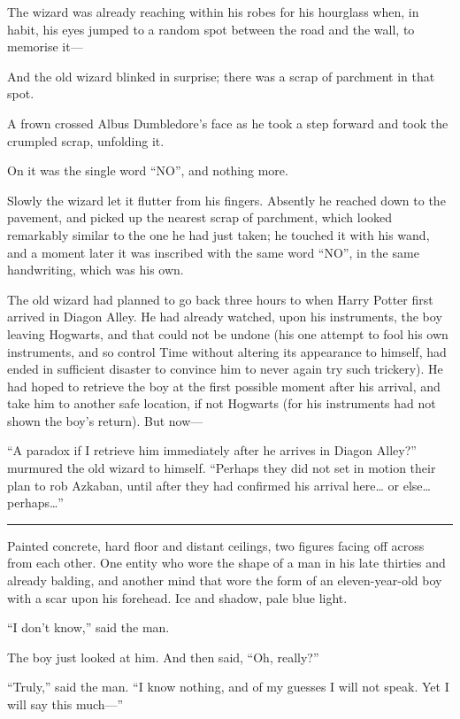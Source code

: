 The wizard was already reaching within his robes for his hourglass when,
in habit, his eyes jumped to a random spot between the road and the
wall, to memorise it---

And the old wizard blinked in surprise; there was a scrap of parchment
in that spot.

A frown crossed Albus Dumbledore's face as he took a step forward and
took the crumpled scrap, unfolding it.

On it was the single word ``NO'', and nothing more.

Slowly the wizard let it flutter from his fingers. Absently he reached
down to the pavement, and picked up the nearest scrap of parchment,
which looked remarkably similar to the one he had just taken; he touched
it with his wand, and a moment later it was inscribed with the same word
``NO'', in the same handwriting, which was his own.

The old wizard had planned to go back three hours to when Harry Potter
first arrived in Diagon Alley. He had already watched, upon his
instruments, the boy leaving Hogwarts, and that could not be undone (his
one attempt to fool his own instruments, and so control Time without
altering its appearance to himself, had ended in sufficient disaster to
convince him to never again try such trickery). He had hoped to retrieve
the boy at the first possible moment after his arrival, and take him to
another safe location, if not Hogwarts (for his instruments had not
shown the boy's return). But now---

``A paradox if I retrieve him immediately after he arrives in Diagon
Alley?'' murmured the old wizard to himself. ``Perhaps they did not set
in motion their plan to rob Azkaban, until after they had confirmed his
arrival here\ldots{} or else\ldots{} perhaps\ldots{}''

\begin{center}\rule{3in}{0.4pt}\end{center}

Painted concrete, hard floor and distant ceilings, two figures facing
off across from each other. One entity who wore the shape of a man in
his late thirties and already balding, and another mind that wore the
form of an eleven-year-old boy with a scar upon his forehead. Ice and
shadow, pale blue light.

``I don't know,'' said the man.

The boy just looked at him. And then said, ``Oh, really?''

``Truly,'' said the man. ``I know nothing, and of my guesses I will not
speak. Yet I will say this much---''
